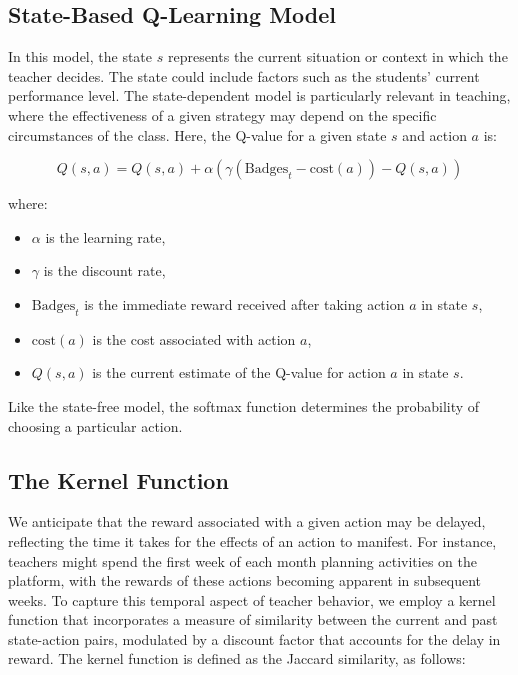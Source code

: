 \documentclass[
  number,
  preprint,
  3p,
  onecolumn]{elsarticle}
\providecommand{\tightlist}{%
  \setlength{\itemsep}{0pt}\setlength{\parskip}{0pt}}\usepackage{longtable,booktabs,array}
\begin{document}
\hypertarget{state-based-q-learning-model}{%
\subsection{State-Based Q-Learning
Model}\label{state-based-q-learning-model}}

In this model, the state \(s\) represents the current situation or
context in which the teacher decides. The state could include factors
such as the students' current performance level. The state-dependent
model is particularly relevant in teaching, where the effectiveness of a
given strategy may depend on the specific circumstances of the class.
Here, the Q-value for a given state \(s\) and action \(a\) is:

\[ Q(s, a) = Q(s, a) + \alpha \left( \gamma (\text{Badges}_t - \text{cost}(a)) - Q(s, a) \right) \]

where:

\begin{itemize}
\tightlist
\item
  \(\alpha\) is the learning rate,
\item
  \(\gamma\) is the discount rate,
\item
  \(\text{Badges}_t\) is the immediate reward received after taking
  action \(a\) in state \(s\),
\item
  \(\text{cost}(a)\) is the cost associated with action \(a\),
\item
  \(Q(s, a)\) is the current estimate of the Q-value for action \(a\) in
  state \(s\).
\end{itemize}

Like the state-free model, the softmax function determines the
probability of choosing a particular action.

\hypertarget{the-kernel-function-1}{%
\subsection{The Kernel Function}\label{the-kernel-function-1}}

We anticipate that the reward associated with a given action may be
delayed, reflecting the time it takes for the effects of an action to
manifest. For instance, teachers might spend the first week of each
month planning activities on the platform, with the rewards of these
actions becoming apparent in subsequent weeks. To capture this temporal
aspect of teacher behavior, we employ a kernel function that
incorporates a measure of similarity between the current and past
state-action pairs, modulated by a discount factor that accounts for the
delay in reward. The kernel function is defined as the Jaccard
similarity, as follows:
\end{document}
